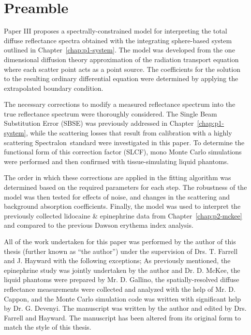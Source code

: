 \label{chap:p3-model}
\section*{Preamble}
Paper III proposes a spectrally-constrained model for interpreting the total diffuse reflectance spectra obtained with the integrating sphere-based system outlined in Chapter~\ref{chap:p1-system}. The model was developed from the one dimensional diffusion theory approximation of the radiation transport equation\cite{Farrell1992} where each scatter point acts as a point source. The coefficients for the solution to the resulting ordinary differential equation were determined by applying the extrapolated boundary condition.

The necessary corrections to modify a measured reflectance spectrum into the true reflectance spectrum were thoroughly considered. The Single Beam Substitution Error (SBSE) was previously addressed in Chapter~\ref{chap:p1-system}, while the scattering losses that result from calibration with a highly scattering Spectralon\textregistered~standard were investigated in this paper. To determine the functional form of this correction factor (SLCF), mono Monte Carlo simulations were performed and then confirmed with tissue-simulating liquid phantoms.

The order in which these corrections are applied in the fitting algorithm was determined based on the required parameters for each step. The robustness of the model was then tested for effects of noise, and changes in the scattering and background absorption coefficients. Finally, the model was used to interpret the previously collected lidocaine \& epinephrine data from Chapter~\ref{chap:p2-mckee} and compared to the previous Dawson erythema index analysis.\cite{Dawson1980}

All of the work undertaken for this paper was performed by the author of this thesis (further known as ``the author'') under the supervision of Drs. T. Farrell and J. Hayward with the following exceptions; As previously mentioned, the epinephrine study was jointly undertaken by the author and Dr. D. McKee, the liquid phantoms were prepared by Mr. D. Gallino, the spatially-resolved diffuse reflectance measurements were collected and analyzed with the help of Mr. D. Cappon, and the Monte Carlo simulation code was written with significant help by Dr. G. Devenyi. The manuscript was written by the author and edited by Drs. Farrell and Hayward. The manuscript has been altered from its original form to match the style of this thesis.

